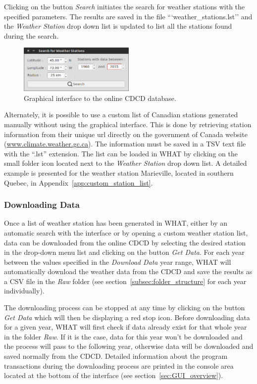 \documentclass[12pt, letterpaper, fleqn]{report}
\begin{document}
Clicking on the button \emph{Search} initiates the search for weather stations with the specified parameters. The results are saved in the file ```weather\_stations.lst'' and the \emph{Weather Station} drop down list is updated to list all the stations found during the search.

\begin{figure}[h]
\centering
\includegraphics[width=0.5\textwidth]{WHAT_Screenshot_search4stations}
\caption[Graphical interface to the online CDCD database.]{Graphical interface to the online CDCD database.}
\label{fig:Screenshot_search4stations}
\end{figure}

Alternately, it is possible to use a custom list of Canadian stations generated manually without using the graphical interface. This is done by retrieving station information from their unique url directly on the government of Canada website (\url{www.climate.weather.gc.ca}). The information must be saved in a TSV text file with the ``.lst'' extension. The list can be loaded in WHAT by clicking on the small folder icon located next to the \emph{Weather Station} drop down list. A detailed example is presented for the weather station Marieville, located in southern Quebec, in Appendix~\ref{app:custom_station_list}.

\subsubsection{Downloading Data}

Once a list of weather station has been generated in WHAT, either by an automatic search with the interface or by opening a custom weather station list, data can be downloaded from the online CDCD by selecting the desired station in the drop-down menu list and clicking on the button \emph{Get Data}. For each year between the values specified in the \emph{Download Data} year range, WHAT will automatically download the weather data from the CDCD and save the results as a CSV file in the \emph{Raw} folder (see section~\ref{subsec:folder_structure} for each year individually).

The downloading process can be stopped at any time by clicking on the button \emph{Get Data} which will then be displaying a red stop icon. Before downloading data for a given year, WHAT will first check if data already exist for that whole year in the folder \emph{Raw}. If it is the case, data for this year won't be downloaded and the process will pass to the following year, otherwise data will be downloaded and saved normally from the CDCD. Detailed information about the program transactions during the downloading process are printed in the console area located at the bottom of the interface (see section~\ref{sec:GUI_overview}).
\end{document}
